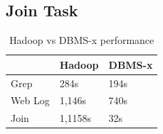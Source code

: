 \documentclass[10pt,twocolumn]{IEEEtran11}
\begin{document}
\subsection {Join Task}



\begin{table}[h!]
	\centering
\begin{tabu} to 0.5\textwidth { | X[l] | X[c] | X[r] | }
	\hline
    & Hadoop & DBMS-x \\
	\hline
	Grep  & 284s  & 194s  \\
	\hline
	Web Log  & 1,146s  & 740s  \\
	\hline
	Join  & 1,1158s  & 32s  \\
	\hline
\end{tabu}
\caption{Hadoop vs DBMS-x performance}
\label{table:1}
\end{table}



\subsection{}



























\end{document}
